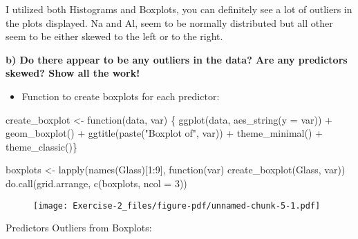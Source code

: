 \documentclass[
  letterpaper,
  DIV=11,
  numbers=noendperiod]{scrartcl}
\newenvironment{Shaded}{\begin{snugshade}}{\end{snugshade}}
\newcommand{\AttributeTok}[1]{\textcolor[rgb]{0.40,0.45,0.13}{#1}}
\newcommand{\ControlFlowTok}[1]{\textcolor[rgb]{0.00,0.23,0.31}{#1}}
\newcommand{\DecValTok}[1]{\textcolor[rgb]{0.68,0.00,0.00}{#1}}
\newcommand{\FunctionTok}[1]{\textcolor[rgb]{0.28,0.35,0.67}{#1}}
\newcommand{\NormalTok}[1]{\textcolor[rgb]{0.00,0.23,0.31}{#1}}
\newcommand{\OtherTok}[1]{\textcolor[rgb]{0.00,0.23,0.31}{#1}}
\newcommand{\SpecialCharTok}[1]{\textcolor[rgb]{0.37,0.37,0.37}{#1}}
\newcommand{\StringTok}[1]{\textcolor[rgb]{0.13,0.47,0.30}{#1}}
\providecommand{\tightlist}{%
  \setlength{\itemsep}{0pt}\setlength{\parskip}{0pt}}\usepackage{longtable,booktabs,array}
\begin{document}
I utilized both Histograms and Boxplots, you can definitely see a lot of
outliers in the plots displayed. Na and Al, seem to be normally
distributed but all other seem to be either skewed to the left or to the
right.

\textbf{b) Do there appear to be any outliers in the data? Are any
predictors skewed? Show all the work! }

\begin{itemize}
\tightlist
\item
  Function to create boxplots for each predictor:
\end{itemize}

\begin{Shaded}
\begin{Highlighting}[]
\NormalTok{create\_boxplot }\OtherTok{\textless{}{-}} \ControlFlowTok{function}\NormalTok{(data, var) \{}
  \FunctionTok{ggplot}\NormalTok{(data, }\FunctionTok{aes\_string}\NormalTok{(}\AttributeTok{y =}\NormalTok{ var)) }\SpecialCharTok{+} 
    \FunctionTok{geom\_boxplot}\NormalTok{() }\SpecialCharTok{+} 
    \FunctionTok{ggtitle}\NormalTok{(}\FunctionTok{paste}\NormalTok{(}\StringTok{"Boxplot of"}\NormalTok{, var)) }\SpecialCharTok{+} 
    \FunctionTok{theme\_minimal}\NormalTok{() }\SpecialCharTok{+}
    \FunctionTok{theme\_classic}\NormalTok{()\}}


\NormalTok{boxplots }\OtherTok{\textless{}{-}} \FunctionTok{lapply}\NormalTok{(}\FunctionTok{names}\NormalTok{(Glass)[}\DecValTok{1}\SpecialCharTok{:}\DecValTok{9}\NormalTok{], }\ControlFlowTok{function}\NormalTok{(var) }\FunctionTok{create\_boxplot}\NormalTok{(Glass, var))}
\FunctionTok{do.call}\NormalTok{(grid.arrange, }\FunctionTok{c}\NormalTok{(boxplots, }\AttributeTok{ncol =} \DecValTok{3}\NormalTok{))}
\end{Highlighting}
\end{Shaded}

\begin{figure}[H]

{\centering \texttt{[image: Exercise-2\_files/figure-pdf/unnamed-chunk-5-1.pdf]}

}

\end{figure}

Predictors Outliers from Boxplots:
\end{document}
